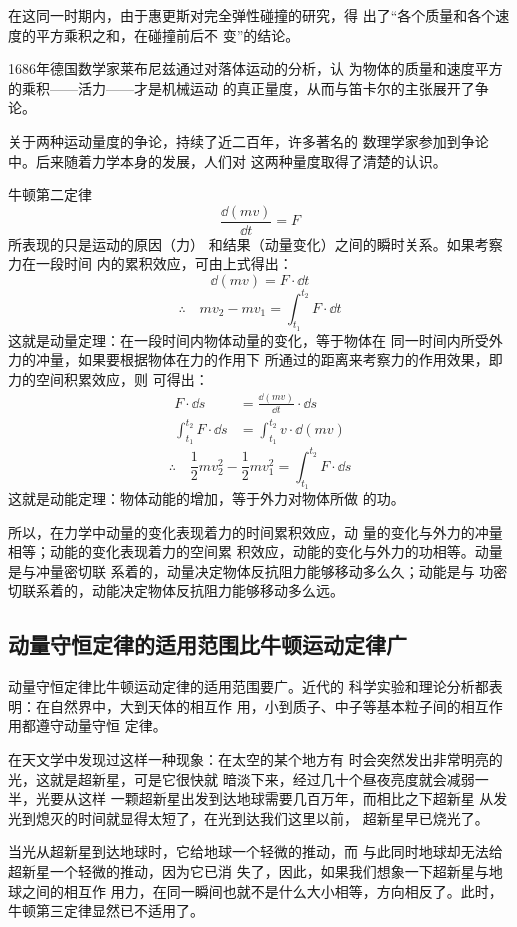 在这同一时期内，由于惠更斯对完全弹性碰撞的研究，得
出了“各个质量和各个速度的平方乘积之和，在碰撞前后不
变”的结论。

1686年德国数学家莱布尼兹通过对落体运动的分析，认
为物体的质量和速度平方的乘积——活力——才是机械运动
的真正量度，从而与笛卡尔的主张展开了争论。

关于两种运动量度的争论，持续了近二百年，许多著名的
数理学家参加到争论中。后来随着力学本身的发展，人们对
这两种量度取得了清楚的认识。

牛顿第二定律
\[\frac{\dd(mv)}{\dd t}=F\]
所表现的只是运动的原因（力）
和结果（动量变化）之间的瞬时关系。如果考察力在一段时间
内的累积效应，可由上式得出：
\[\dd(mv)=F\cdot \dd t\]
\[\therefore\quad mv_2-mv_1=\int^{t_2}_{t_1}F\cdot \dd t\]
这就是动量定理：在一段时间内物体动量的变化，等于物体在
同一时间内所受外力的冲量，如果要根据物体在力的作用下
所通过的距离来考察力的作用效果，即力的空间积累效应，则
可得出：
\[\begin{split}
    F\cdot \dd s&=\frac{\dd(mv)}{\dd t}\cdot \dd s\\
    \int^{t_2}_{t_1}F\cdot \dd s&=\int^{t_2}_{t_1}v\cdot \dd (mv)
\end{split}\]
\[\therefore\quad \frac{1}{2}mv^2_2-\frac{1}{2}mv^2_1=\int^{t_2}_{t_1}F\cdot \dd s\]
这就是动能定理：物体动能的增加，等于外力对物体所做
的功。

所以，在力学中动量的变化表现着力的时间累积效应，动
量的变化与外力的冲量相等；动能的变化表现着力的空间累
积效应，动能的变化与外力的功相等。动量是与冲量密切联
系着的，动量决定物体反抗阻力能够移动多么久；动能是与
功密切联系着的，动能决定物体反抗阻力能够移动多么远。


\subsection{动量守恒定律的适用范围比牛顿运动定律广}
动量守恒定律比牛顿运动定律的适用范围要广。近代的
科学实验和理论分析都表明：在自然界中，大到天体的相互作
用，小到质子、中子等基本粒子间的相互作用都遵守动量守恒
定律。

在天文学中发现过这样一种现象：在太空的某个地方有
时会突然发出非常明亮的光，这就是超新星，可是它很快就
暗淡下来，经过几十个昼夜亮度就会减弱一半，光要从这样
一颗超新星出发到达地球需要几百万年，而相比之下超新星
从发光到熄灭的时间就显得太短了，在光到达我们这里以前，
超新星早已烧光了。

当光从超新星到达地球时，它给地球一个轻微的推动，而
与此同时地球却无法给超新星一个轻微的推动，因为它已消
失了，因此，如果我们想象一下超新星与地球之间的相互作
用力，在同一瞬间也就不是什么大小相等，方向相反了。此时，
牛顿第三定律显然已不适用了。

